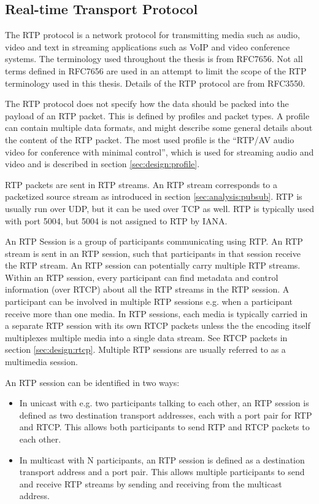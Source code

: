 \subsection{Real-time Transport Protocol} \label{sec:design:rtp}
The RTP protocol is a network protocol for transmitting media such as audio, video and text in streaming applications such as \ac{VoIP} and video conference systems. The terminology used throughout the thesis is from RFC7656\citep{RFC7656}. Not all terms defined in RFC7656 are used in an attempt to limit the scope of the RTP terminology used in this thesis. Details of the RTP protocol are from RFC3550\citep{RFC3550}.

The RTP protocol does not specify how the data should be packed into the payload of an RTP packet. This is defined by profiles and packet types. A profile can contain multiple data formats, and might describe some general details about the content of the RTP packet.
The most used profile is the ``RTP/AV audio video for conference with minimal control'', which is used for streaming audio and video and is described in section \ref{sec:design:profile}.

 \label{sec:design:rtpstream}
RTP packets are sent in RTP streams. An RTP stream corresponds to a packetized source stream as introduced in section \ref{sec:analysis:pubsub}. RTP is usually run over UDP, but it can be used over TCP as well. RTP is typically used with port 5004, but 5004 is not assigned to RTP by IANA\citep{iana_ports}.


 \label{sec:design:rtpsession}
An RTP Session is a group of participants communicating using RTP.
An RTP stream is sent in an RTP session, such that participants in that session receive the RTP stream. An RTP session can potentially carry multiple RTP streams. Within an RTP session, every participant can find metadata and control information (over RTCP) about all the RTP streams in the RTP session. A participant can be involved in multiple RTP sessions e.g. when a participant receive more than one media. In RTP sessions, each media is typically carried in a separate RTP session with its own RTCP packets unless the the encoding itself multiplexes multiple media into a single data stream. See RTCP packets in section \ref{sec:design:rtcp}. Multiple RTP sessions are usually referred to as a multimedia session.


An RTP session can be identified in two ways:
\begin{itemize}
	\item In unicast with e.g. two participants talking to each other, an RTP session is defined as two destination transport addresses, each with a port pair for RTP and RTCP. This allows both participants to send RTP and RTCP packets to each other.
	\item In multicast with N participants, an RTP session is defined as a destination transport address and a port pair. This allows multiple participants to send and receive RTP streams by sending and receiving from the multicast address.
\end{itemize}


